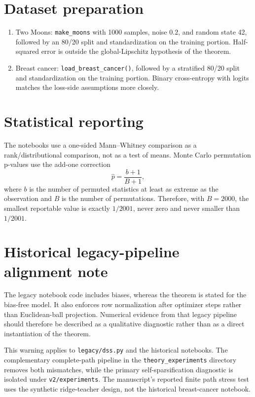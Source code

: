 \documentclass[11pt,a4paper]{article}
\begin{document}
\section*{Dataset preparation}

\begin{enumerate}
\item Two Moons: \texttt{make\_moons} with 1000 samples, noise $0.2$, and random state 42, followed by an 80/20 split and standardization on the training portion. Half-squared error is outside the global-Lipschitz hypothesis of the theorem.
\item Breast cancer: \texttt{load\_breast\_cancer()}, followed by a stratified 80/20 split and standardization on the training portion. Binary cross-entropy with logits matches the loss-side assumptions more closely.
\end{enumerate}

\section*{Statistical reporting}

The notebooks use a one-sided Mann--Whitney comparison as a rank/distributional comparison, not as a test of means. Monte Carlo permutation p-values use the add-one correction
\[
\widehat p=\frac{b+1}{B+1},
\]
where $b$ is the number of permuted statistics at least as extreme as the observation and $B$ is the number of permutations. Therefore, with $B=2000$, the smallest reportable value is exactly $1/2001$, never zero and never smaller than $1/2001$.

\section*{Historical legacy-pipeline alignment note}

The legacy notebook code includes biases, whereas the theorem is stated for the bias-free model. It also enforces row normalization after optimizer steps rather than Euclidean-ball projection. Numerical evidence from that legacy pipeline should therefore be described as a qualitative diagnostic rather than as a direct instantiation of the theorem.

This warning applies to \texttt{legacy/dss.py} and the historical notebooks.
The complementary complete-path pipeline in the \texttt{theory\_experiments}
directory removes both mismatches, while the primary self-sparsification
diagnostic is isolated under \texttt{v2/experiments}.  The manuscript's
reported finite path stress test uses the synthetic ridge-teacher design, not
the historical breast-cancer notebook.
\end{document}
